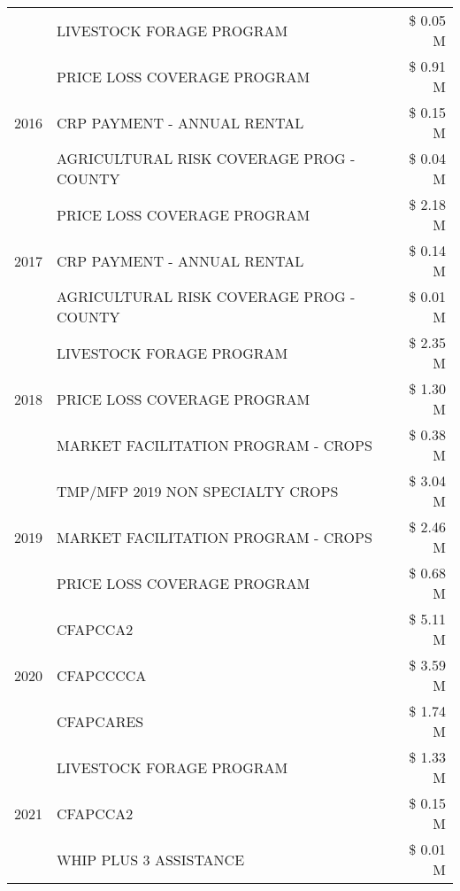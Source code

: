 \begin{tabular}{llr}
 & LIVESTOCK FORAGE PROGRAM & \$ 0.05 M \\
\cline{1-3}
\multirow[t]{3}{*}{2016} & PRICE LOSS COVERAGE PROGRAM & \$ 0.91 M \\
 & CRP PAYMENT - ANNUAL RENTAL & \$ 0.15 M \\
 & AGRICULTURAL RISK COVERAGE PROG - COUNTY & \$ 0.04 M \\
\cline{1-3}
\multirow[t]{3}{*}{2017} & PRICE LOSS COVERAGE PROGRAM & \$ 2.18 M \\
 & CRP PAYMENT - ANNUAL RENTAL & \$ 0.14 M \\
 & AGRICULTURAL RISK COVERAGE PROG - COUNTY & \$ 0.01 M \\
\cline{1-3}
\multirow[t]{3}{*}{2018} & LIVESTOCK FORAGE PROGRAM & \$ 2.35 M \\
 & PRICE LOSS COVERAGE PROGRAM & \$ 1.30 M \\
 & MARKET FACILITATION PROGRAM - CROPS & \$ 0.38 M \\
\cline{1-3}
\multirow[t]{3}{*}{2019} & TMP/MFP 2019 NON SPECIALTY CROPS & \$ 3.04 M \\
 & MARKET FACILITATION PROGRAM - CROPS & \$ 2.46 M \\
 & PRICE LOSS COVERAGE PROGRAM & \$ 0.68 M \\
\cline{1-3}
\multirow[t]{3}{*}{2020} & CFAPCCA2 & \$ 5.11 M \\
 & CFAPCCCCA & \$ 3.59 M \\
 & CFAPCARES & \$ 1.74 M \\
\cline{1-3}
\multirow[t]{3}{*}{2021} & LIVESTOCK FORAGE PROGRAM & \$ 1.33 M \\
 & CFAPCCA2 & \$ 0.15 M \\
 & WHIP PLUS 3 ASSISTANCE & \$ 0.01 M \\
\cline{1-3}
\bottomrule
\end{tabular}
